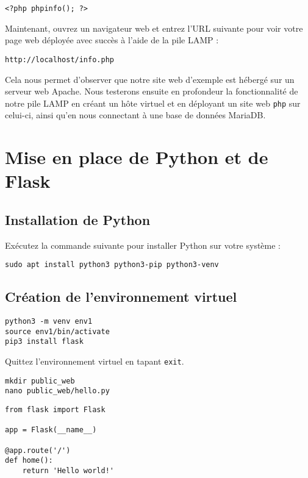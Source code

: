 \begin{lstlisting}[style=tf]
<?php phpinfo(); ?>
\end{lstlisting}

Maintenant, ouvrez un navigateur web et entrez l'URL suivante pour voir votre page web déployée avec succès à l'aide de la pile LAMP :

\begin{lstlisting}
http://localhost/info.php
\end{lstlisting}

Cela nous permet d'observer que notre site web d'exemple est hébergé sur un serveur web Apache. Nous testerons ensuite en profondeur la fonctionnalité de notre pile LAMP en créant un hôte virtuel et en déployant un site web \texttt{php} sur celui-ci, ainsi qu'en nous connectant à une base de données MariaDB.

\section{Mise en place de Python et de Flask}

\subsection{Installation de Python}
Exécutez la commande suivante pour installer Python sur votre système :

\begin{lstlisting}
sudo apt install python3 python3-pip python3-venv
\end{lstlisting}

\subsection{Création de l'environnement virtuel}

\begin{lstlisting}
python3 -m venv env1
source env1/bin/activate
pip3 install flask
\end{lstlisting}

Quittez l'environnement virtuel en tapant \texttt{exit}.

\begin{lstlisting}
mkdir public_web
nano public_web/hello.py
\end{lstlisting}

\begin{lstlisting}[style=tf]
from flask import Flask

app = Flask(__name__)

@app.route('/')
def home():
	return 'Hello world!'
\end{lstlisting}


